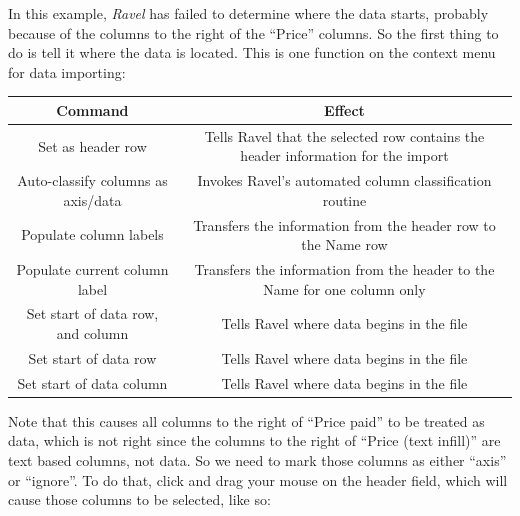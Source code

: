 In this example, \emph{Ravel} has failed to determine where the data
starts, probably because of the columns to the right of the ``Price''
columns. So the first thing to do is tell it where the data is located.
This is one function on the context menu for data importing:

\begin{tabular}{|c|c|}
\hline 
Command & Effect\tabularnewline
\hline 
\hline 
Set as header row & Tells Ravel that the selected row contains the header information
for the import\tabularnewline
\hline 
Auto-classify columns as axis/data & Invokes Ravel's automated column classification routine\tabularnewline
\hline 
Populate column labels & Transfers the information from the header row to the Name row\tabularnewline
\hline 
Populate current column label & Transfers the information from the header to the Name for one column
only\tabularnewline
\hline 
Set start of data row, and column & Tells Ravel where data begins in the file\tabularnewline
\hline 
Set start of data row & Tells Ravel where data begins in the file\tabularnewline
\hline 
Set start of data column & Tells Ravel where data begins in the file\tabularnewline
\hline 
\end{tabular}
\begin{center}
\par\end{center}

Note that this causes all columns to the right of ``Price paid''
to be treated as data, which is not right since the columns to the
right of ``Price (text infill)'' are text based columns, not data.
So we need to mark those columns as either ``axis'' or ``ignore''.
To do that, click and drag your mouse on the header field, which will
cause those columns to be selected, like so:
\begin{center}
\par\end{center}

